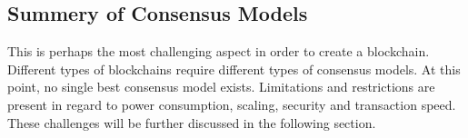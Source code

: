 \subsection{Summery of Consensus Models}
\begin{table}[htb] 
  
  \centering
  \label{tab:consensus}  
  \begin{center}
\end{center}
\end{table}


This is perhaps the most challenging aspect in order to create a blockchain. Different types of blockchains require different types of consensus models.  
At this point, no single best consensus model exists. Limitations and restrictions are present in regard to power consumption, scaling, security and transaction speed. These challenges will be further discussed in the following section. 


